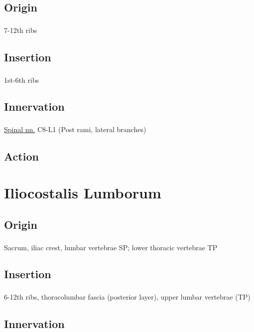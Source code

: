 \documentclass[
  letterpaper,
  DIV=11,
  numbers=noendperiod]{scrartcl}
\begin{document}
\subsection{Origin}\label{origin-1}

7-12th ribs\textsuperscript{}

\subsection{Insertion}\label{insertion-1}

1st-6th ribs\textsuperscript{}

\subsection{Innervation}\label{innervation-1}

\href{../../../../Alchemy\%20Archive/Anatomy/Nerves/spinal_nerves.qmd}{Spinal
nn.} C8-L1 (Post rami, lateral
branches)\textsuperscript{}

\subsection{Action}\label{action-1}

\section{Iliocostalis Lumborum}\label{iliocostalis-lumborum}

\subsection{Origin}\label{origin-2}

Sacrum, iliac crest, lumbar vertebrae SP; lower thoracic vertebrae
TP\textsuperscript{}

\subsection{Insertion}\label{insertion-2}

6-12th ribs, thoracolumbar fascia (posterior layer), upper lumbar
vertebrae (TP)\textsuperscript{}

\subsection{Innervation}\label{innervation-2}
\end{document}
